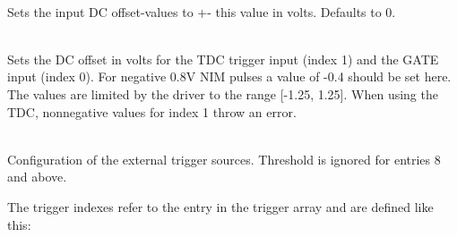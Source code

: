 			\\
			Sets the input DC offset-values to +- this value in volts. Defaults to 0.\par

			\\
			Sets the DC offset in volts for the TDC trigger input (index 1) and the GATE input (index 0). For negative 0.8V NIM pulses a value of -0.4 should be set here.
			The values are limited by the driver to the range [-1.25, 1.25]. When using the TDC, nonnegative values for index 1 throw an error. \par

			\\
			Configuration of the external trigger sources. Threshold is ignored for entries 8 and above.\par
			
			The trigger indexes refer to the entry in the trigger array and are defined like this:\par

			\\
			\\
			\\
			\\
			\\
			\\
			\\
			\\
			\\
			\\
			\\
			\\
			\\
			\\
			\par
			
			\\
			\par
			
